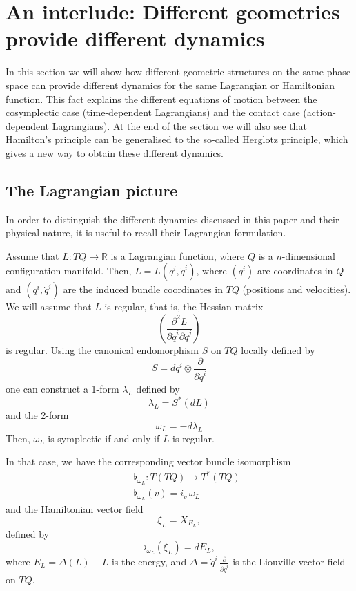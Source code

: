 \documentclass[12pt]{article}
\begin{document}

\section{An interlude: Different geometries provide different dynamics}\label{interlude}

In this section we will show how different geometric structures on the same phase space can provide different dynamics for the same Lagrangian or Hamiltonian function. This fact explains the different equations of motion between the cosymplectic case (time-dependent Lagrangians) and the contact case (action-dependent Lagrangians). At the end of the section we will also see that Hamilton's principle can be generalised to the so-called Herglotz principle, which gives a new way to obtain these different dynamics.

\subsection{The Lagrangian picture}

In order to distinguish the different dynamics discussed in this paper and their physical nature, it is useful to recall their Lagrangian formulation.

Assume that $L : TQ  \longrightarrow \mathbb R$ is a Lagrangian function, 
where $Q$ is a $n$-dimensional configuration manifold. Then, $L = L(q^i, \dot{q}^i)$, where
$(q^i)$ are coordinates in $Q$ and $(q^i, \dot{q}^i)$ are the induced bundle coordinates in $TQ$ (positions and velocities).
We will assume that $L$ is regular, that is, the Hessian matrix
$$
\left( \frac{\partial^2 L}{\partial \dot{q}^i \partial \dot{q}^j} \right)
$$
is regular.
Using the canonical endomorphism $S$ on $TQ$ locally defined by
$$
S = d q^i \otimes \frac{\partial}{\partial \dot{q}^i}
$$
one can construct a 1-form $\lambda_L$ defined by
$$
\lambda_L = S^* (dL)
$$
and the 2-form
$$
\omega_L = - d\lambda_L
$$
Then, $\omega_L$ is symplectic if and only if $L$ is regular.

In that case, we have the corresponding vector bundle isomorphism
\begin{eqnarray*}
&&\flat_{\omega_L} :  T(TQ) \longrightarrow T^*(TQ)\\
&&\flat_{\omega_L} (v) = i_v \, \omega_L 
\end{eqnarray*}
and the Hamiltonian vector field
$$
\xi_L = X_{E_L},
$$
defined by 
$$
\flat_{\omega_L}(\xi_L) = dE_L,
$$
where $E_L = \Delta(L) -L$ is the energy, and $\Delta = \dot{q}^i \, \frac{\partial}{\partial \dot{q}^i}$ is the Liouville vector field on $TQ$.\\
\end{document}

